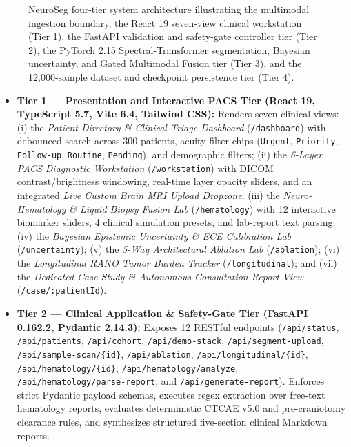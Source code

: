 \documentclass[journal,onecolumn,10pt]{IEEEtran}
\begin{document}
\begin{figure}[t]
\caption{NeuroSeg four-tier system architecture illustrating the multimodal ingestion boundary, the React 19 seven-view clinical workstation (Tier 1), the FastAPI validation and safety-gate controller tier (Tier 2), the PyTorch 2.15 Spectral-Transformer segmentation, Bayesian uncertainty, and Gated Multimodal Fusion tier (Tier 3), and the 12,000-sample dataset and checkpoint persistence tier (Tier 4).}
\label{fig:arch}
\end{figure}

\begin{itemize}
    \item \textbf{Tier 1 --- Presentation and Interactive PACS Tier (React 19, TypeScript 5.7, Vite 6.4, Tailwind CSS):} Renders seven clinical views: (i) the \textit{Patient Directory \& Clinical Triage Dashboard} (\texttt{/dashboard}) with debounced search across 300 patients, acuity filter chips (\texttt{Urgent}, \texttt{Priority}, \texttt{Follow-up}, \texttt{Routine}, \texttt{Pending}), and demographic filters; (ii) the \textit{6-Layer PACS Diagnostic Workstation} (\texttt{/workstation}) with DICOM contrast/brightness windowing, real-time layer opacity sliders, and an integrated \textit{Live Custom Brain MRI Upload Dropzone}; (iii) the \textit{Neuro-Hematology \& Liquid Biopsy Fusion Lab} (\texttt{/hematology}) with 12 interactive biomarker sliders, 4 clinical simulation presets, and lab-report text parsing; (iv) the \textit{Bayesian Epistemic Uncertainty \& ECE Calibration Lab} (\texttt{/uncertainty}); (v) the \textit{5-Way Architectural Ablation Lab} (\texttt{/ablation}); (vi) the \textit{Longitudinal RANO Tumor Burden Tracker} (\texttt{/longitudinal}); and (vii) the \textit{Dedicated Case Study \& Autonomous Consultation Report View} (\texttt{/case/:patientId}).
    \item \textbf{Tier 2 --- Clinical Application \& Safety-Gate Tier (FastAPI 0.162.2, Pydantic 2.14.3):} Exposes 12 RESTful endpoints (\texttt{/api/status}, \texttt{/api/patients}, \texttt{/api/cohort}, \texttt{/api/demo-stack}, \texttt{/api/segment-upload}, \texttt{/api/sample-scan/\{id\}}, \texttt{/api/ablation}, \texttt{/api/longitudinal/\{id\}}, \texttt{/api/hematology/\{id\}}, \texttt{/api/hematology/analyze}, \texttt{/api/hematology/parse-report}, and \texttt{/api/generate-report}). Enforces strict Pydantic payload schemas, executes regex extraction over free-text hematology reports, evaluates deterministic CTCAE v5.0 and pre-craniotomy clearance rules, and synthesizes structured five-section clinical Markdown reports.

\end{itemize}
\end{document}
